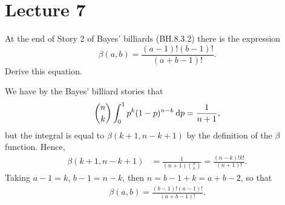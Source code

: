 \documentclass[lectures]{subfiles}
\begin{document}
\section{Lecture 7}
\label{sec:lecture-7}

\begin{exercise}
At the end of Story 2 of Bayes' billiards (BH.8.3.2) there is the expression
\begin{equation}
\label{eq:72}
\beta(a,b) = \frac{(a-1)!(b-1)!}{(a+b-1)!}.
\end{equation}
Derive this equation.
\begin{solution}
We have by the Bayes' billiard stories that
\begin{align}
{n \choose k} \int_0^1 p^k(1-p)^{n-k}\,\textrm{d}p = \frac{1}{n+1},
\end{align}
but the integral is equal to $\beta(k+1, n-k+1)$ by the definition of the $\beta$ function. Hence,
\begin{align*}
\beta(k+1, n-k+1)
&= \frac{1}{(n+1) {n \choose k}} = \frac{(n-k)!k!}{(n+1)!}.
\end{align*}
Taking $a-1 = k$, $b-1 =n -k$, then $n=b-1+k = a+b-2$, so that
\begin{align*}
\beta(a, b) = \frac{(b-1)!(a-1)!}{(a+b-1)!}.
\end{align*}
\end{solution}
\end{exercise}
\end{document}
